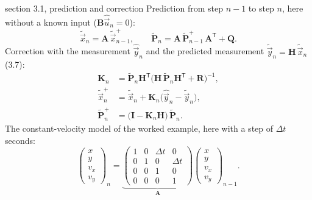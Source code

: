 \documentclass[11pt,a4paper,parskip=half]{scrartcl}
\newcommand{\mat}[1]{\mathbf{#1}}
\newcommand{\T}{^{\mathsf{T}}}
\begin{document}
\begin{script}{section 3.1, prediction and correction}
Prediction from step \(n-1\) to step \(n\), here without a known input (\(\mat B \hat{\vec u}_n = 0\)):
\begin{equation}
  \tilde{\vec x}_n = \mat A\,\tilde{\vec x}_{n-1}^+ ,
  \qquad
  \tilde{\mat P}_n = \mat A\,\tilde{\mat P}_{n-1}^+\,\mat A\T + \mat Q .
  \tag{3.6, 3.8}
\end{equation}
Correction with the measurement \(\hat{\vec y}_n\) and the predicted measurement
\(\tilde{\vec y}_n = \mat H\,\tilde{\vec x}_n\) (3.7):
\begin{align}
  \mat K_n &= \tilde{\mat P}_n \mat H\T \big(\mat H\,\tilde{\mat P}_n \mat H\T + \mat R\big)^{-1} ,
  \tag{3.10}\\
  \tilde{\vec x}_n^+ &= \tilde{\vec x}_n + \mat K_n \big(\hat{\vec y}_n - \tilde{\vec y}_n\big) ,
  \tag{3.11}\\
  \tilde{\mat P}_n^+ &= \big(\mat I - \mat K_n \mat H\big)\,\tilde{\mat P}_n .
  \tag{3.12}
\end{align}
The constant-velocity model of the worked example, here with a step of \(\Delta t\) seconds:
\begin{equation}
  \begin{pmatrix} x\\ y\\ v_x\\ v_y \end{pmatrix}_n =
  \underbrace{\begin{pmatrix} 1&0&\Delta t&0\\ 0&1&0&\Delta t\\ 0&0&1&0\\ 0&0&0&1 \end{pmatrix}}_{\mat A}
  \begin{pmatrix} x\\ y\\ v_x\\ v_y \end{pmatrix}_{n-1} .
  \tag{3.13}
\end{equation}
\end{script}
\end{document}
